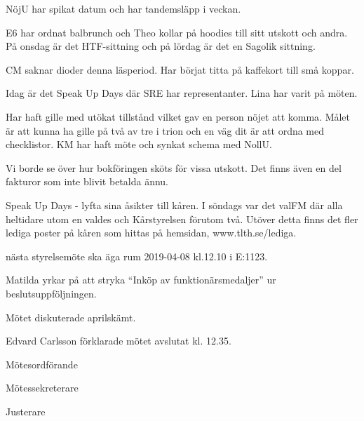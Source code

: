 \documentclass[10pt]{article}
\def\mo{Edvard Carlsson}
\def\ms{Saga Åslund}
\def\ji{Theo Nyman}
\begin{document}
\begin{paragrafer}
\begin{paragrafer}
NöjU har spikat datum och har tandemsläpp i veckan. 

E6 har ordnat balbrunch och Theo kollar på hoodies till sitt utskott och andra. På onsdag är det HTF-sittning och på lördag är det en Sagolik sittning.

CM saknar dioder denna läsperiod. Har börjat titta på kaffekort till små koppar. 

Idag är det Speak Up Days där SRE har representanter. Lina har varit på möten. 

Har haft gille med utökat tillstånd vilket gav en person nöjet att komma. Målet är att kunna ha gille på två av tre i trion och en väg dit är att ordna med checklistor. KM har haft möte och synkat schema med NollU. 


Vi borde se över hur bokföringen sköts för vissa utskott. Det finns även en del fakturor som inte blivit betalda ännu.  

Speak Up Days - lyfta sina åsikter till kåren. 
I söndags var det valFM där alla heltidare utom en valdes och Kårstyrelsen förutom två. Utöver detta finns det fler lediga poster på kåren som hittas på hemsidan, www.tlth.se/lediga. 
\end{paragrafer}

\Mba nästa styrelsemöte ska äga rum 2019-04-08 kl.12.10 i E:1123.

Matilda yrkar på att stryka ``Inköp av funktionärsmedaljer'' ur beslutsuppföljningen.

\Mbaby


Mötet diskuterade aprilskämt.

{\mo} förklarade mötet avslutat kl. 12.35.
\end{paragrafer}

\hidesignfoot
\begin{signatures}{3}
\signature{\mo}{Mötesordförande}
\signature{\ms}{Mötessekreterare}
\signature{\ji}{Justerare}
\end{signatures}
\end{document}
